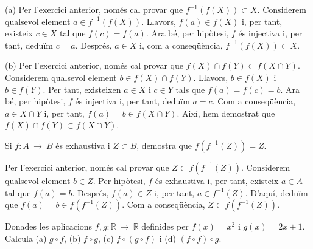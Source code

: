 \begin{solucio}
(a) Per l'exercici anterior, només cal provar que $f^{-1}\left(
f(X)\right) \subset X$. Considerem qualsevol element $a\in f^{-1}\left(
f(X)\right) $. Llavors, $f(a)\in f(X)$ i, per tant, existeix $c\in X$ tal
que $f(c)=f(a)$. Ara bé, per hipòtesi, $f$ és injectiva i, per
tant, deduïm $c=a$. Després, $a\in X$ i, com a conseqüència, $f^{-1}\left( f(X)\right) \subset X$.

(b) Per l'exercici anterior, només cal provar que $f(X)\cap f(Y)\subset
f(X\cap Y)$. Considerem qualsevol element $b\in f(X)\cap f(Y)$. Llavors, $%
b\in f(X)$ i $b\in f(Y)$. Per tant, existeixen $a\in X$ i $c\in Y$ tals que $%
f(a)=f(c)=b$. Ara bé, per hipòtesi, $f$ és injectiva i, per
tant, deduïm $a=c$. Com a conseqüència, $a\in X\cap Y$ i, per
tant, $f(a)=b\in f(X\cap Y)$. Així, hem demostrat que $f(X)\cap
f(Y)\subset f(X\cap Y)$.
\end{solucio}

\begin{exercici}
Si $f:A~\longrightarrow ~B$ és exhaustiva i $Z\subset B$, demostra que $%
f\left( f^{-1}(Z)\right) =Z$.
\end{exercici}

\begin{solucio}
Per l'exercici anterior, només cal provar que $Z\subset f\left(
f^{-1}(Z)\right) $. Considerem qualsevol element $b\in Z$. Per hipòtesi,
$f$ és exhaustiva i, per tant, existeix $a\in A$ tal que $f(a)=b$. Després, $f(a)\in Z$ i, per tant, $a\in f^{-1}(Z)$. D'aquí, deduïm
que $f(a)=b\in f\left( f^{-1}(Z)\right) $. Com a conseqüència, $%
Z\subset f\left( f^{-1}(Z)\right) $.
\end{solucio}

\begin{exercici}
Donades les aplicacions $f,g:\mathbb{R}~\longrightarrow ~\mathbb{R}$
definides per $f(x)=x^{2}$ i $g(x)=2x+1$. Calcula (a) $g\circ f$, (b) $%
f\circ g$, (c) $f\circ (g\circ f)$ i (d) $(f\circ f)\circ g$.
\end{exercici}

